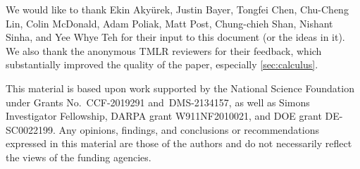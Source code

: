We would like to thank Ekin Aky\"{u}rek, Justin Bayer, Tongfei Chen, Chu-Cheng Lin, Colin McDonald, Adam Poliak, Matt Post, Chung-chieh Shan, Nishant Sinha, and Yee Whye Teh for their input to this document (or the ideas in it). We also thank the anonymous TMLR reviewers for their feedback, which substantially improved the quality of the paper, especially \cref{sec:calculus}.

This material is based upon work supported by the National Science Foundation under Grants No.~CCF-2019291 and~DMS-2134157, as well as Simons Investigator Fellowship, DARPA grant W911NF2010021, and DOE grant DE-SC0022199. 
Any opinions, findings, and conclusions or recommendations expressed in this material are those of the authors and do not necessarily reflect the views of the funding agencies.
